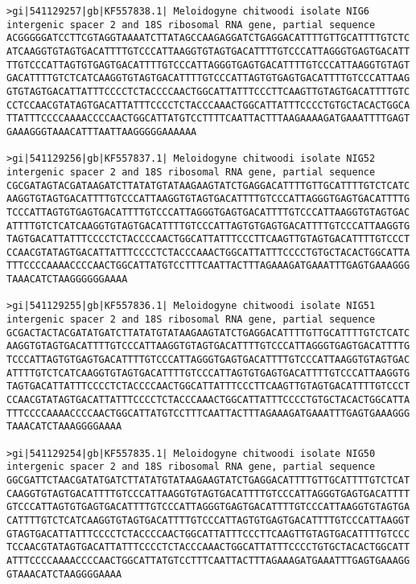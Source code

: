 \documentclass[11pt]{article}
\begin{document}
\begin{Verbatim}[commandchars=\\\{\}]
>gi|541129257|gb|KF557838.1| Meloidogyne chitwoodi isolate NIG6 intergenic spacer 2 and 18S ribosomal RNA gene, partial sequence
ACGGGGGATCCTTCGTAGGTAAAATCTTATAGCCAAGAGGATCTGAGGACATTTTGTTGCATTTTGTCTC
ATCAAGGTGTAGTGACATTTTGTCCCATTAAGGTGTAGTGACATTTTGTCCCATTAGGGTGAGTGACATT
TTGTCCCATTAGTGTGAGTGACATTTTGTCCCATTAGGGTGAGTGACATTTTGTCCCATTAAGGTGTAGT
GACATTTTGTCTCATCAAGGTGTAGTGACATTTTGTCCCATTAGTGTGAGTGACATTTTGTCCCATTAAG
GTGTAGTGACATTATTTCCCCTCTACCCCAACTGGCATTATTTCCCTTCAAGTTGTAGTGACATTTTGTC
CCTCCAACGTATAGTGACATTATTTCCCCTCTACCCAAACTGGCATTATTTCCCCTGTGCTACACTGGCA
TTATTTCCCCAAAACCCCAACTGGCATTATGTCCTTTTCAATTACTTTAAGAAAAGATGAAATTTTGAGT
GAAAGGGTAAACATTTAATTAAGGGGGAAAAAA

>gi|541129256|gb|KF557837.1| Meloidogyne chitwoodi isolate NIG52 intergenic spacer 2 and 18S ribosomal RNA gene, partial sequence
CGCGATAGTACGATAAGATCTTATATGTATAAGAAGTATCTGAGGACATTTTGTTGCATTTTGTCTCATC
AAGGTGTAGTGACATTTTGTCCCATTAAGGTGTAGTGACATTTTGTCCCATTAGGGTGAGTGACATTTTG
TCCCATTAGTGTGAGTGACATTTTGTCCCATTAGGGTGAGTGACATTTTGTCCCATTAAGGTGTAGTGAC
ATTTTGTCTCATCAAGGTGTAGTGACATTTTGTCCCATTAGTGTGAGTGACATTTTGTCCCATTAAGGTG
TAGTGACATTATTTCCCCTCTACCCCAACTGGCATTATTTCCCTTCAAGTTGTAGTGACATTTTGTCCCT
CCAACGTATAGTGACATTATTTCCCCTCTACCCAAACTGGCATTATTTCCCCTGTGCTACACTGGCATTA
TTTCCCCAAAACCCCAACTGGCATTATGTCCTTTCAATTACTTTAGAAAGATGAAATTTGAGTGAAAGGG
TAAACATCTAAGGGGGGAAAA

>gi|541129255|gb|KF557836.1| Meloidogyne chitwoodi isolate NIG51 intergenic spacer 2 and 18S ribosomal RNA gene, partial sequence
GCGACTACTACGATATGATCTTATATGTATAAGAAGTATCTGAGGACATTTTGTTGCATTTTGTCTCATC
AAGGTGTAGTGACATTTTGTCCCATTAAGGTGTAGTGACATTTTGTCCCATTAGGGTGAGTGACATTTTG
TCCCATTAGTGTGAGTGACATTTTGTCCCATTAGGGTGAGTGACATTTTGTCCCATTAAGGTGTAGTGAC
ATTTTGTCTCATCAAGGTGTAGTGACATTTTGTCCCATTAGTGTGAGTGACATTTTGTCCCATTAAGGTG
TAGTGACATTATTTCCCCTCTACCCCAACTGGCATTATTTCCCTTCAAGTTGTAGTGACATTTTGTCCCT
CCAACGTATAGTGACATTATTTCCCCTCTACCCAAACTGGCATTATTTCCCCTGTGCTACACTGGCATTA
TTTCCCCAAAACCCCAACTGGCATTATGTCCTTTCAATTACTTTAGAAAGATGAAATTTGAGTGAAAGGG
TAAACATCTAAAGGGGAAAA

>gi|541129254|gb|KF557835.1| Meloidogyne chitwoodi isolate NIG50 intergenic spacer 2 and 18S ribosomal RNA gene, partial sequence
GGCGATTCTAACGATATGATCTTATATGTATAAGAAGTATCTGAGGACATTTTGTTGCATTTTGTCTCAT
CAAGGTGTAGTGACATTTTGTCCCATTAAGGTGTAGTGACATTTTGTCCCATTAGGGTGAGTGACATTTT
GTCCCATTAGTGTGAGTGACATTTTGTCCCATTAGGGTGAGTGACATTTTGTCCCATTAAGGTGTAGTGA
CATTTTGTCTCATCAAGGTGTAGTGACATTTTGTCCCATTAGTGTGAGTGACATTTTGTCCCATTAAGGT
GTAGTGACATTATTTCCCCTCTACCCCAACTGGCATTATTTCCCTTCAAGTTGTAGTGACATTTTGTCCC
TCCAACGTATAGTGACATTATTTCCCCTCTACCCAAACTGGCATTATTTCCCCTGTGCTACACTGGCATT
ATTTCCCCAAAACCCCAACTGGCATTATGTCCTTTCAATTACTTTAGAAAGATGAAATTTGAGTGAAAGG
GTAAACATCTAAGGGGAAAA


\end{Verbatim}
\end{document}
